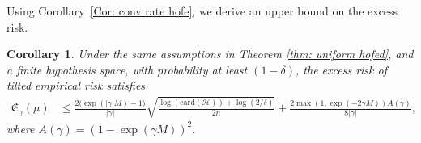 \documentclass{article}
\theoremstyle{plain}
\theoremstyle{plain}
\newtheorem{corollary}[theorem]{Corollary}
\theoremstyle{definition}
\theoremstyle{remark}
\newtheorem{remark}[theorem]{Remark}
\begin{document}

Using Corollary~\ref{Cor: conv rate hofe}, we derive an upper bound on the excess risk.

\begin{tcolorbox}
    \begin{corollary}\label{Cor: excess risk}
    Under the same assumptions in Theorem \ref{thm: uniform hofed}, and a finite hypothesis space,  with probability at least $(1-\delta)$, the excess risk of tilted empirical risk satisfies
    \begin{equation} \nonumber 
        \begin{split}
           \mathfrak{E}_{\gamma}(\mu)&\leq \frac{2\big(\exp(|\gamma|M)-1\big)}{|\gamma|}\sqrt{\frac{\log(\mathrm{card}(\mathcal{H}))+\log(2/\delta)}{2n}}+\frac{2\max(1,\exp(-2\gamma M))A(\gamma)}{8|\gamma|},
        \end{split}
    \end{equation}
    where $A(\gamma)=(1-\exp(\gamma M))^2$.
\end{corollary} 
\end{tcolorbox}
\end{document}
